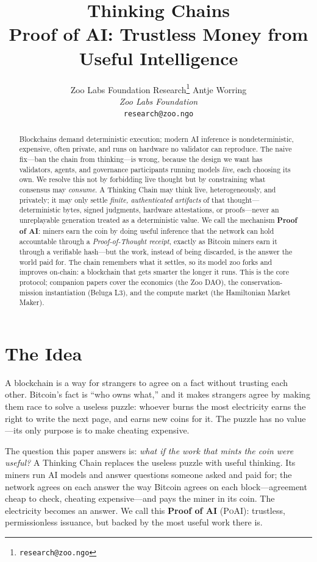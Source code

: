 \documentclass[11pt]{article}
\title{\textbf{\Huge Thinking Chains}\\[4pt]
\large Proof of AI: Trustless Money from Useful Intelligence}
\author{Zoo Labs Foundation Research\thanks{\texttt{research@zoo.ngo}} \quad Antje Worring\\
\textit{Zoo Labs Foundation}\\ \texttt{research@zoo.ngo}}
\date{}
\newcommand{\PoAI}{\textsc{PoAI}}
\begin{document}
\maketitle

\begin{abstract}
\noindent
Blockchains demand deterministic execution; modern AI inference is nondeterministic, expensive, often private, and runs on hardware no validator can reproduce. The naive fix---ban the chain from thinking---is wrong, because the design we want has validators, agents, and governance participants running models \emph{live}, each choosing its own. We resolve this not by forbidding live thought but by constraining what consensus may \emph{consume}. A Thinking Chain may think live, heterogeneously, and privately; it may only settle \emph{finite, authenticated artifacts} of that thought---deterministic bytes, signed judgments, hardware attestations, or proofs---never an unreplayable generation treated as a deterministic value. We call the mechanism \textbf{Proof of AI}: miners earn the coin by doing useful inference that the network can hold accountable through a \emph{Proof-of-Thought receipt}, exactly as Bitcoin miners earn it through a verifiable hash---but the work, instead of being discarded, is the answer the world paid for. The chain remembers what it settles, so its model zoo forks and improves on-chain: a blockchain that gets smarter the longer it runs. This is the core protocol; companion papers cover the economics (the Zoo DAO), the conservation-mission instantiation (Beluga L3), and the compute market (the Hamiltonian Market Maker).
\end{abstract}

\section{The Idea}

A blockchain is a way for strangers to agree on a fact without trusting each other. Bitcoin's fact is ``who owns what,'' and it makes strangers agree by making them race to solve a useless puzzle: whoever burns the most electricity earns the right to write the next page, and earns new coins for it. The puzzle has no value---its only purpose is to make cheating expensive.

The question this paper answers is: \emph{what if the work that mints the coin were useful?} A Thinking Chain replaces the useless puzzle with useful thinking. Its miners run AI models and answer questions someone asked and paid for; the network agrees on each answer the way Bitcoin agrees on each block---agreement cheap to check, cheating expensive---and pays the miner in its coin. The electricity becomes an answer. We call this \textbf{Proof of AI} (\PoAI{}): trustless, permissionless issuance, but backed by the most useful work there is.
\end{document}
